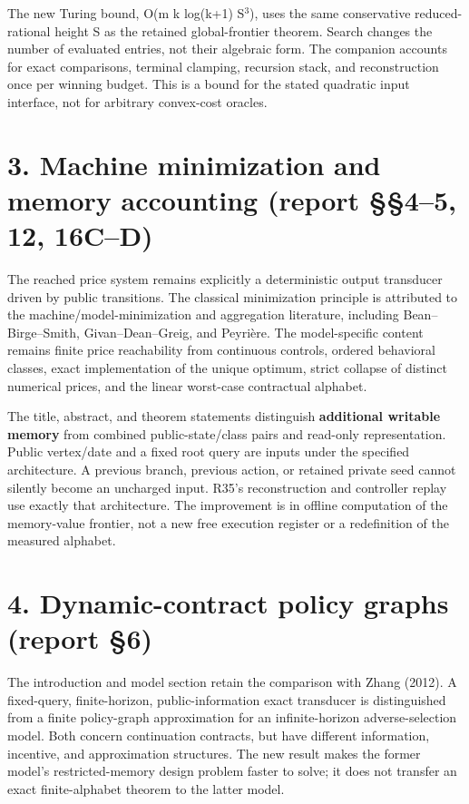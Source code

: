 \documentclass[11pt,letterpaper]{article}
\begin{document}
The new Turing bound, O(m k log(k+1) S$^3$), uses the same conservative reduced-rational height S as the retained global-frontier theorem. Search changes the number of evaluated entries, not their algebraic form. The companion accounts for exact comparisons, terminal clamping, recursion stack, and reconstruction once per winning budget. This is a bound for the stated quadratic input interface, not for arbitrary convex-cost oracles.


\section*{3. Machine minimization and memory accounting (report §§4--5, 12, 16C--D)}

The reached price system remains explicitly a deterministic output transducer driven by public transitions. The classical minimization principle is attributed to the machine/model-minimization and aggregation literature, including Bean--Birge--Smith, Givan--Dean--Greig, and Peyrière. The model-specific content remains finite price reachability from continuous controls, ordered behavioral classes, exact implementation of the unique optimum, strict collapse of distinct numerical prices, and the linear worst-case contractual alphabet.


The title, abstract, and theorem statements distinguish \textbf{additional writable memory} from combined public-state/class pairs and read-only representation. Public vertex/date and a fixed root query are inputs under the specified architecture. A previous branch, previous action, or retained private seed cannot silently become an uncharged input. R35's reconstruction and controller replay use exactly that architecture. The improvement is in offline computation of the memory-value frontier, not a new free execution register or a redefinition of the measured alphabet.


\section*{4. Dynamic-contract policy graphs (report §6)}

The introduction and model section retain the comparison with Zhang (2012). A fixed-query, finite-horizon, public-information exact transducer is distinguished from a finite policy-graph approximation for an infinite-horizon adverse-selection model. Both concern continuation contracts, but have different information, incentive, and approximation structures. The new result makes the former model's restricted-memory design problem faster to solve; it does not transfer an exact finite-alphabet theorem to the latter model.
\end{document}
